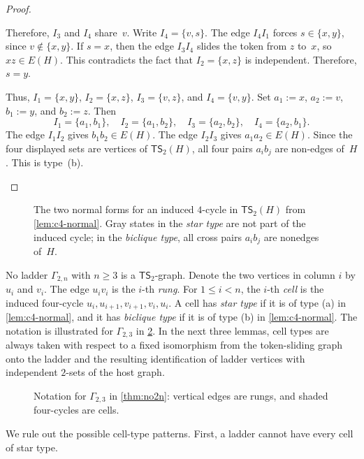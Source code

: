 \documentclass[a4paper]{article}
\theoremstyle{plain}
\theoremstyle{definition}
\newcommand{\TSsym}{\mathsf{TS}}
\numberwithin{equation}{section}
\begin{document}
\begin{proof}
\begin{itemize}
Therefore, $I_3$ and $I_4$ share~$v$.
Write $I_4=\{v,s\}$.
The edge $I_4I_1$ forces $s\in\{x,y\}$, since $v\notin\{x,y\}$.
If $s=x$, then the edge $I_3I_4$ slides the token from $z$ to~$x$, so $xz\in E(H)$.
This contradicts the fact that $I_2=\{x,z\}$ is independent.
Therefore, $s=y$.

Thus, $I_1=\{x,y\}$, $I_2=\{x,z\}$, $I_3=\{v,z\}$, and $I_4=\{v,y\}$.
Set $a_1:=x$, $a_2:=v$, $b_1:=y$, and $b_2:=z$.
Then
\[
I_1=\{a_1,b_1\},\quad
I_2=\{a_1,b_2\},\quad
I_3=\{a_2,b_2\},\quad
I_4=\{a_2,b_1\}.
\]
The edge $I_1I_2$ gives $b_1b_2\in E(H)$.
The edge $I_2I_3$ gives $a_1a_2\in E(H)$.
Since the four displayed sets are vertices of $\TSsym_2(H)$, all four pairs $a_i b_j$ are non-edges of~$H$.
This is type~\textup{(b)}.
\end{itemize}
\end{proof}

\begin{figure}[ht]
\centering

\caption{The two normal forms for an induced $4$-cycle in $\TSsym_2(H)$ from \cref{lem:c4-normal}. Gray states in the \emph{star type} are not part of the induced cycle; in the \emph{biclique type}, all cross pairs $a_i b_j$ are nonedges of~$H$.}
\label{fig:c4-normal-types}
\end{figure}

No ladder $\Gamma_{2,n}$ with $n\ge 3$ is a $\TSsym_2$-graph.
Denote the two vertices in column $i$ by $u_i$ and $v_i$.
The edge $u_i v_i$ is the $i$-th \emph{rung}.
For $1\le i<n$, the $i$-th \emph{cell} is the induced four-cycle $u_i,u_{i+1},v_{i+1},v_i,u_i$.
A cell has \emph{star type} if it is of type \textup{(a)} in \cref{lem:c4-normal}, and it has \emph{biclique type} if it is of type \textup{(b)} in \cref{lem:c4-normal}.
The notation is illustrated for $\Gamma_{2,3}$ in \cref{fig:ladder-23-notation}.
In the next three lemmas, cell types are always taken with respect to a fixed isomorphism from the token-sliding graph onto the ladder and the resulting identification of ladder vertices with independent $2$-sets of the host graph.

\begin{figure}[ht]
\centering

\caption{Notation for $\Gamma_{2,3}$ in \cref{thm:no2n}: vertical edges are rungs, and shaded four-cycles are cells.}
\label{fig:ladder-23-notation}
\end{figure}

We rule out the possible cell-type patterns.
First, a ladder cannot have every cell of star type.
\end{document}
